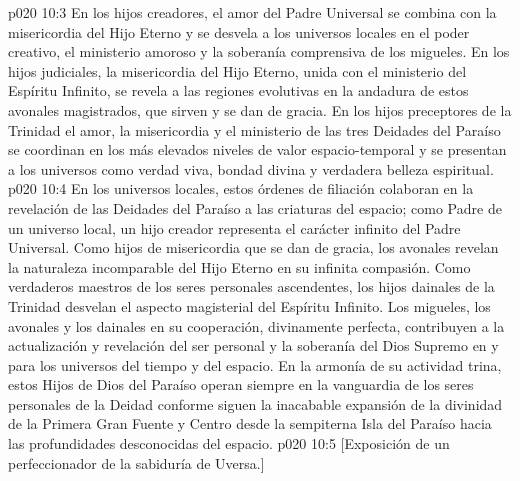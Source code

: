 \vs p020 10:3 En los hijos creadores, el amor del Padre Universal se combina con la misericordia del Hijo Eterno y se desvela a los universos locales en el poder creativo, el ministerio amoroso y la soberanía comprensiva de los migueles. En los hijos judiciales, la misericordia del Hijo Eterno, unida con el ministerio del Espíritu Infinito, se revela a las regiones evolutivas en la andadura de estos avonales magistrados, que sirven y se dan de gracia. En los hijos preceptores de la Trinidad el amor, la misericordia y el ministerio de las tres Deidades del Paraíso se coordinan en los más elevados niveles de valor espacio\hyp{}temporal y se presentan a los universos como verdad viva, bondad divina y verdadera belleza espiritual.
\vs p020 10:4 En los universos locales, estos órdenes de filiación colaboran en la revelación de las Deidades del Paraíso a las criaturas del espacio; como Padre de un universo local, un hijo creador representa el carácter infinito del Padre Universal. Como hijos de misericordia que se dan de gracia, los avonales revelan la naturaleza incomparable del Hijo Eterno en su infinita compasión. Como verdaderos maestros de los seres personales ascendentes, los hijos dainales de la Trinidad desvelan el aspecto magisterial del Espíritu Infinito. Los migueles, los avonales y los dainales en su cooperación, divinamente perfecta, contribuyen a la actualización y revelación del ser personal y la soberanía del Dios Supremo en y para los universos del tiempo y del espacio. En la armonía de su actividad trina, estos Hijos de Dios del Paraíso operan siempre en la vanguardia de los seres personales de la Deidad conforme siguen la inacabable expansión de la divinidad de la Primera Gran Fuente y Centro desde la sempiterna Isla del Paraíso hacia las profundidades desconocidas del espacio.
\vsetoff
\vs p020 10:5 [Exposición de un perfeccionador de la sabiduría de Uversa.]
